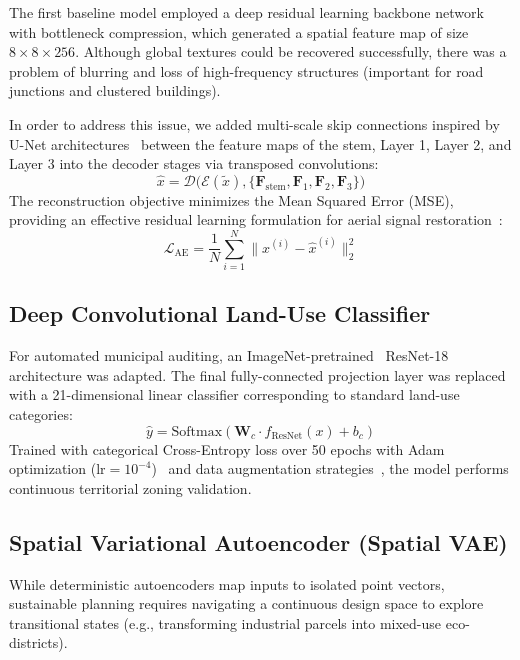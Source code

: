\documentclass[conference]{IEEEtran}
\begin{document}
The first baseline model employed a deep residual learning backbone network~\cite{he2016deep} with bottleneck compression, which generated a spatial feature map of size $8 \times 8 \times 256$. Although global textures could be recovered successfully, there was a problem of blurring and loss of high-frequency structures (important for road junctions and clustered buildings).

In order to address this issue, we added multi-scale skip connections inspired by U-Net architectures~\cite{ronneberger2015u} between the feature maps of the stem, Layer 1, Layer 2, and Layer 3 into the decoder stages via transposed convolutions:
\begin{equation}
\hat{x} = \mathcal{D}\Big(\mathcal{E}(\tilde{x}), \{\mathbf{F}_{\text{stem}}, \mathbf{F}_1, \mathbf{F}_2, \mathbf{F}_3\}\Big)
\end{equation}
The reconstruction objective minimizes the Mean Squared Error (MSE), providing an effective residual learning formulation for aerial signal restoration~\cite{zhang2017beyond}:
\begin{equation}
\mathcal{L}_{\text{AE}} = \frac{1}{N} \sum_{i=1}^N \|x^{(i)} - \hat{x}^{(i)}\|_2^2
\end{equation}

\subsection{Deep Convolutional Land-Use Classifier}
For automated municipal auditing, an ImageNet-pretrained~\cite{krizhevsky2012imagenet} ResNet-18 architecture was adapted. The final fully-connected projection layer was replaced with a 21-dimensional linear classifier corresponding to standard land-use categories:
\begin{equation}
\hat{y} = \text{Softmax}(\mathbf{W}_c \cdot f_{\text{ResNet}}(x) + b_c)
\end{equation}
Trained with categorical Cross-Entropy loss over 50 epochs with Adam optimization ($\text{lr} = 10^{-4}$)~\cite{kingma2014adam} and data augmentation strategies~\cite{perez2017effectiveness}, the model performs continuous territorial zoning validation.

\subsection{Spatial Variational Autoencoder (Spatial VAE)}
While deterministic autoencoders map inputs to isolated point vectors, sustainable planning requires navigating a continuous design space to explore transitional states (e.g., transforming industrial parcels into mixed-use eco-districts).
\end{document}
